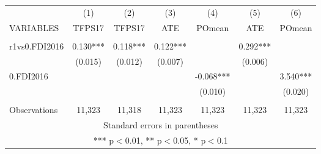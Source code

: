 \documentclass[]{article}
\begin{document}
\begin{tabular}{lcccccc} \hline
 & (1) & (2) & (3) & (4) & (5) & (6) \\
VARIABLES & TFPS17 & TFPS17 & ATE & POmean & ATE & POmean \\ \hline
 &  &  &  &  &  &  \\
r1vs0.FDI2016 & 0.130*** & 0.118*** & 0.122*** &  & 0.292*** &  \\
 & (0.015) & (0.012) & (0.007) &  & (0.006) &  \\
0.FDI2016 &  &  &  & -0.068*** &  & 3.540*** \\
 &  &  &  & (0.010) &  & (0.020) \\
 &  &  &  &  &  &  \\
 Observations & 11,323 & 11,318 & 11,323 & 11,323 & 11,323 & 11,323 \\ \hline
\multicolumn{7}{c}{ Standard errors in parentheses} \\
\multicolumn{7}{c}{ *** p$<$0.01, ** p$<$0.05, * p$<$0.1} \\
\end{tabular}
\end{document}
